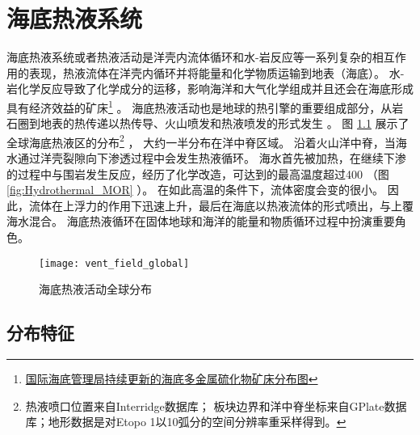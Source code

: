 
\chapter{海底热液系统} 
海底热液系统或者热液活动是洋壳内流体循环和水-岩反应等一系列复杂的相互作用的表现，热液流体在洋壳内循环并将能量和化学物质运输到地表（海底）。
水-岩化学反应导致了化学成分的运移，影响海洋和大气化学组成并且还会在海底形成具有经济效益的矿床\footnote{\href{ http://www.isa.org.jm/files/images/maps//Sulphides_Global.jpg} {国际海底管理局持续更新的海底多金属硫化物矿床分布图} } 。
海底热液活动也是地球的热引擎的重要组成部分，从岩石圈到地表的热传递以热传导、火山喷发和热液喷发的形式发生 \citep{LOWELL2014} 。
图 \ref{fig:ventFields_Global} 展示了全球海底热液区的分布\footnote{热液喷口位置来自Interridge数据库；
	板块边界和洋中脊坐标来自GPlate数据库；地形数据是对Etopo 1以10弧分的空间分辨率重采样得到。} ，
大约一半分布在洋中脊区域。
沿着火山洋中脊，当海水通过洋壳裂隙向下渗透过程中会发生热液循环。
海水首先被加热，在继续下渗的过程中与围岩发生反应，经历了化学改造，可达到的最高温度超过400 \ssd （图 \ref{fig:Hydrothermal_MOR} ）。
在如此高温的条件下，流体密度会变的很小。
因此，流体在上浮力的作用下迅速上升，最后在海底以热液流体的形式喷出，与上覆海水混合。
海底热液循环在固体地球和海洋的能量和物质循环过程中扮演重要角色。

\begin{figure} [htbp] 
	\centering
	\texttt{[image: vent\_field\_global]} 
	\caption[海底热液活动全球分布]{海底热液活动全球分布} 
	\label{fig:ventFields_Global} 
\end{figure} 

\section{分布特征}  %

